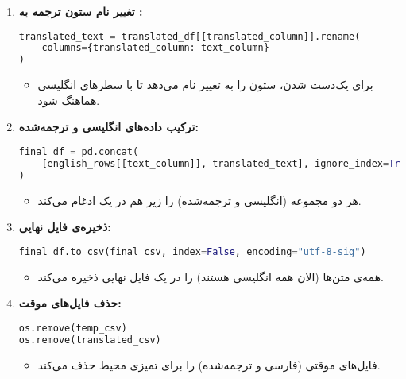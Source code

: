 \documentclass{article}
\begin{document}
\begin{enumerate}
    \item \textbf{تغییر نام ستون ترجمه به :}
    \begin{latin}
    \begin{lstlisting}[language=Python]
translated_text = translated_df[[translated_column]].rename(
    columns={translated_column: text_column}
)
    \end{lstlisting}
    \end{latin}
    \begin{itemize}
        \item برای یک‌دست شدن، ستون  را به  تغییر نام می‌دهد تا با سطرهای انگلیسی هماهنگ شود.
    \end{itemize}

    \item \textbf{ترکیب داده‌های انگلیسی و ترجمه‌شده:}
    \begin{latin}
    \begin{lstlisting}[language=Python]
final_df = pd.concat(
    [english_rows[[text_column]], translated_text], ignore_index=True
)
    \end{lstlisting}
    \end{latin}
    \begin{itemize}
        \item هر دو مجموعه (انگلیسی و ترجمه‌شده) را زیر هم در یک  ادغام می‌کند.
    \end{itemize}

    \item \textbf{ذخیره‌ی فایل نهایی:}
    \begin{latin}
    \begin{lstlisting}[language=Python]
final_df.to_csv(final_csv, index=False, encoding="utf-8-sig")
    \end{lstlisting}
    \end{latin}
    \begin{itemize}
        \item همه‌ی متن‌ها (الان همه انگلیسی هستند) را در یک فایل  نهایی ذخیره می‌کند.
    \end{itemize}

    \item \textbf{حذف فایل‌های موقت:}
    \begin{latin}
    \begin{lstlisting}[language=Python]
os.remove(temp_csv)
os.remove(translated_csv)
    \end{lstlisting}
    \end{latin}
    \begin{itemize}
        \item فایل‌های موقتی (فارسی و ترجمه‌شده) را برای تمیزی محیط حذف می‌کند.
    \end{itemize}


\end{enumerate}
\end{document}
